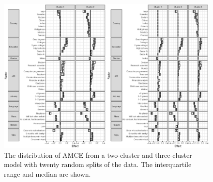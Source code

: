 \begin{figure}[!htbp]
	\centering {}
\includegraphics[width=\textwidth]{figures/app_repeat_hh_AME.eps}
\caption{The distribution of AMCE from a two-cluster and three-cluster model with twenty random splits of the data. The interquartile range and median are shown.} \label{fig:perm_AMCE}
\end{figure}
